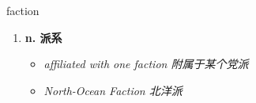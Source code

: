 
\begin{frame}
{\huge faction}
\begin{center}
\begin{enumerate}\Large
  \item \textbf{n. 派系}
  \begin{itemize}
    \item \em{\Large{affiliated with one faction 附属于某个党派}}
    \item \em{\Large{North-Ocean Faction 北洋派}}
  \end{itemize}
\end{enumerate}
\end{center}
\end{frame}
